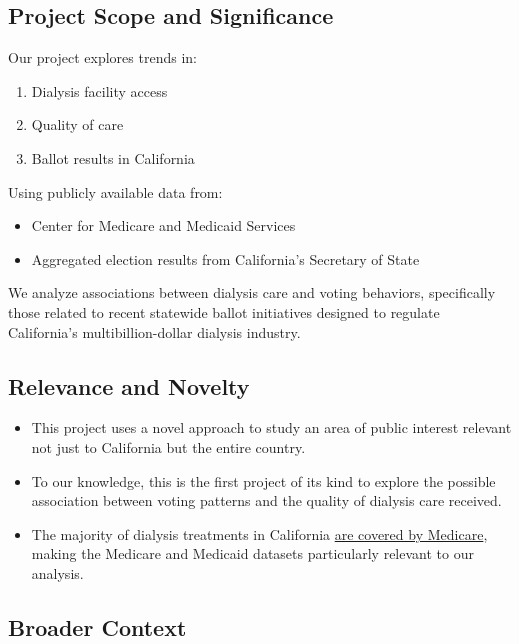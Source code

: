 \documentclass[
  11pt,
  letterpaper,
  DIV=11,
  numbers=noendperiod]{scrartcl}
\providecommand{\tightlist}{%
  \setlength{\itemsep}{0pt}\setlength{\parskip}{0pt}}\usepackage{longtable,booktabs,array}
\begin{document}
\subsection{Project Scope and
Significance}\label{project-scope-and-significance}

Our project explores trends in:

\begin{enumerate}
\def\labelenumi{\arabic{enumi}.}
\tightlist
\item
  Dialysis facility access
\item
  Quality of care
\item
  Ballot results in California
\end{enumerate}

Using publicly available data from:

\begin{itemize}
\tightlist
\item
  Center for Medicare and Medicaid Services
\item
  Aggregated election results from California's Secretary of State
\end{itemize}

We analyze associations between dialysis care and voting behaviors,
specifically those related to recent statewide ballot initiatives
designed to regulate California's multibillion-dollar dialysis industry.

\subsection{Relevance and Novelty}\label{relevance-and-novelty}

\begin{itemize}
\tightlist
\item
  This project uses a novel approach to study an area of public interest
  relevant not just to California but the entire country.
\item
  To our knowledge, this is the first project of its kind to explore the
  possible association between voting patterns and the quality of
  dialysis care received.
\item
  The majority of dialysis treatments in California
  \href{https://lao.ca.gov/BallotAnalysis/Proposition?number=29&year=2022}{are
  covered by Medicare}, making the Medicare and Medicaid datasets
  particularly relevant to our analysis.
\end{itemize}

\subsection{Broader Context}\label{broader-context}
\end{document}
